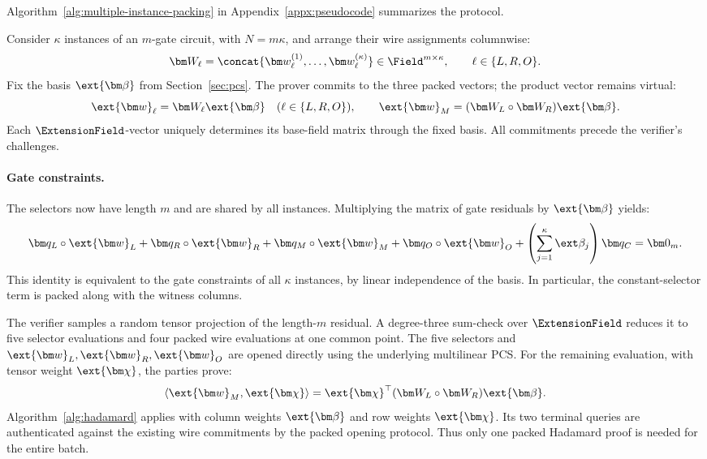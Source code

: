 Algorithm~\ref{alg:multiple-instance-packing} in
Appendix~\ref{appx:pseudocode} summarizes the protocol.

Consider \(\kappa\) instances of an \(m\)-gate circuit, with
\(N=m\kappa\), and arrange their wire assignments columnwise:
\[
    \bm W_\ell
       =\concat{\bm w_\ell^{(1)},\ldots,\bm w_\ell^{(\kappa)}}
       \in\Field^{m\times\kappa},
       \qquad \ell\in\{L,R,O\}.
\]
Fix the basis \(\ext{\bm\beta}\) from Section~\ref{sec:pcs}.
The prover commits to the three packed vectors; the product
vector remains virtual:
\begin{equation}
    \ext{\bm w}_\ell=\bm W_\ell\ext{\bm\beta}
       \quad(\ell\in\{L,R,O\}),
    \qquad
    \ext{\bm w}_M=(\bm W_L\circ\bm W_R)\ext{\bm\beta}.
\label{eq:together-multiple-wires}
\end{equation}
Each \(\ExtensionField\)-vector uniquely determines its
base-field matrix through the fixed basis.
All commitments precede the verifier's challenges.

\paragraph{Gate constraints.}
The selectors now have length \(m\) and are shared by all
instances. Multiplying the matrix of gate residuals by
\(\ext{\bm\beta}\) yields:
\begin{equation}
    \bm q_L\circ\ext{\bm w}_L
    +\bm q_R\circ\ext{\bm w}_R
    +\bm q_M\circ\ext{\bm w}_M
    +\bm q_O\circ\ext{\bm w}_O
    +\left(\sum_{j=1}^{\kappa}\ext\beta_j\right)\bm q_C
       =\bm0_m.
\label{eq:together-multiple-gates}
\end{equation}
This identity is equivalent to the gate constraints of all
\(\kappa\) instances, by linear independence of the basis.
In particular, the constant-selector term is packed along
with the witness columns.

The verifier samples a random tensor projection of the length-\(m\)
residual. A degree-three sum-check over \(\ExtensionField\)
reduces it to five selector evaluations and four packed wire
evaluations at one common point.
The five selectors and
\(\ext{\bm w}_L,\ext{\bm w}_R,\ext{\bm w}_O\)
are opened directly using the underlying multilinear PCS.
For the remaining evaluation, with tensor weight
\(\ext{\bm\chi}\), the parties prove:
\begin{equation}
    \left\langle\ext{\bm w}_M,\ext{\bm\chi}\right\rangle
       =\ext{\bm\chi}^{\top}
          (\bm W_L\circ\bm W_R)\ext{\bm\beta}.
\label{eq:together-multiple-product-opening}
\end{equation}
Algorithm~\ref{alg:hadamard} applies with column weights
\(\ext{\bm\beta}\) and row weights \(\ext{\bm\chi}\).
Its two terminal queries are authenticated against the existing
wire commitments by the packed opening protocol.
Thus only one packed Hadamard proof is needed for the entire batch.

